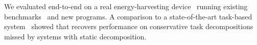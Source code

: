 
We evaluated \sys end-to-end on a real energy-harvesting device~\citep{wisp}
running existing benchmarks~\citep{chain,alpaca} and new programs. A comparison
to a state-of-the-art task-based system~\citep{chain,alpaca} showed that \sys
recovers performance on conservative task decompositions missed by systems with
static decomposition.
%
%


